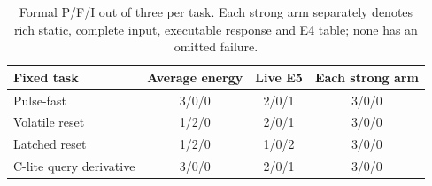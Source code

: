 \begin{table}[htbp]
\centering\small
\caption{Formal P/F/I out of three per task. Each strong arm separately denotes rich static, complete input, executable response and E4 table; none has an omitted failure.}
\label{tab:tasks}
\begin{tabular}{@{}lccc@{}}\toprule
Fixed task & Average energy & Live E5 & Each strong arm \\\midrule
Pulse-fast & 3/0/0 & 2/0/1 & 3/0/0 \\
Volatile reset & 1/2/0 & 2/0/1 & 3/0/0 \\
Latched reset & 1/2/0 & 1/0/2 & 3/0/0 \\
C-lite query derivative & 3/0/0 & 2/0/1 & 3/0/0 \\
\bottomrule\end{tabular}
\end{table}
